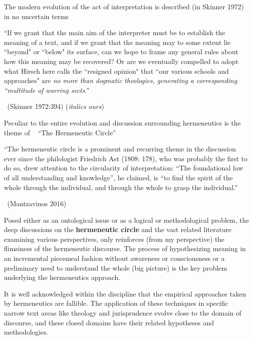 The modern evolution of the act of interpretation is described (in Skinner 1972) in no uncertain terms

\begin{myquote}
“If we grant that the main aim of the interpreter must be to establish the meaning of a text, and if we grant that the meaning may to some extent lie “beyond" or “below" its surface, can we hope to frame any general rules about how this meaning may be recovered? Or are we eventually compelled to adopt what Hirsch here calls the “resigned opinion" that “our various schools and approaches" are \textit{no more than dogmatic theologies, generating a corresponding “multitude of warring sects}."

~\hfill (Skinner 1972:394) (\textit{italics ours})
\end{myquote}

\smallskip

Peculiar to the entire evolution and discussion surrounding hermeneutics is the theme of   “The Hermeneutic Circle”

\smallskip

\begin{myquote}
“The hermeneutic circle is a prominent and recurring theme in the discussion ever since the philologist Friedrich Ast (1808: 178), who was probably the first to do so, drew attention to the circularity of interpretation: “The foundational law of all understanding and knowledge”, he claimed, is “to find the spirit of the whole through the individual, and through the whole to grasp the individual.”

~\hfill (Mantzavinos 2016)
\end{myquote}

\smallskip

Posed either as an ontological issue or as a logical or methodological problem, the deep discussions on the \textbf{hermeneutic circle} and the vast related literature examining various perspectives, only reinforces (from my perspective) the flimsiness of the hermeneutic discourse. The process of hypothesizing meaning in an incremental piecemeal fashion without awareness or consciousness or a preliminary need to understand the whole (big picture) is the key problem underlying the hermeneutics approach.

It is well acknowledged within the discipline that the empirical approaches taken by hermeneutics are fallible. The application of these techniques in specific narrow text areas like theology and jurisprudence evolve close to the domain of discourse, and these closed domains have their related hypotheses and methodologies.

